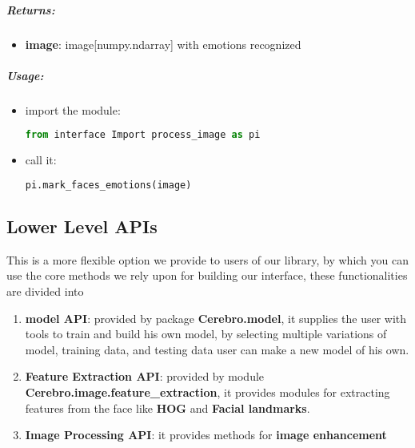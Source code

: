 \subparagraph{Returns:}
\begin{changemargin}{0.5cm}{0cm}
\begin{itemize}[noitemsep,nolistsep]
	\item \textbf{image}: image[numpy.ndarray] with emotions recognized 
\end{itemize}
\end{changemargin}

\subparagraph{Usage:}
\begin{changemargin}{0.5cm}{0cm}
\begin{itemize}
	\item import the module:
	\begin{lstlisting}[language=Python]
	from interface Import process_image as pi\end{lstlisting}
	
	\item call it:
	\begin{lstlisting}[language=Python]
	pi.mark_faces_emotions(image)\end{lstlisting}
\end{itemize}
\end{changemargin}

\subsection{Lower Level APIs}
This is a more flexible option we provide to users of our library, by which you can use the core methods we rely upon for building our interface, these functionalities are divided into
\begin{enumerate}
	\item \textbf{model API}: provided by package \textbf{Cerebro.model}, it supplies the user with tools to train and build his own model, by selecting multiple variations of model, training data, and testing data user can make a new model of his own. 
	\item \textbf{Feature Extraction API}: provided by module \textbf{Cerebro.image.feature\_extraction}, it provides modules for extracting features from the face like \textbf{HOG} and \textbf{Facial landmarks}.
	\item \textbf{Image Processing API}: it provides methods for \textbf{image enhancement}
\end{enumerate}

